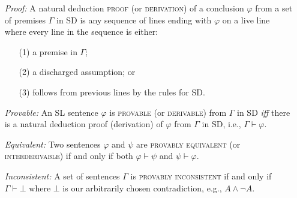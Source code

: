 \documentclass[a4paper, 11pt]{article} %
\begin{document}
\begin{enumerate}
  \item[\it Proof:] A natural deduction \textsc{proof} (or \textsc{derivation}) of a conclusion $\varphi$ from a set of premises $\Gamma$ in SD is any sequence of lines ending with $\varphi$ on a live line where every line in the sequence is either:
      \begin{itemize}
        \item[(1)] a premise in $\Gamma$; 
        \item[(2)] a discharged assumption; or
        \item[(3)] follows from previous lines by the rules for SD.
      \end{itemize}
  \item[\it Provable:] An SL sentence $\varphi$ is \textsc{provable} (or \textsc{derivable}) from $\Gamma$ in SD \textit{iff} there is a natural deduction proof (derivation) of $\varphi$ from $\Gamma$ in SD, i.e., $\Gamma \vdash \varphi$. 
  \item[\it Equivalent:] Two sentences $\varphi$ and $\psi$ are \textsc{provably equivalent} (or \textsc{interderivable}) if and only if both $\varphi\vdash\psi$ and $\psi\vdash\varphi$.
  \item[\it Inconsistent:] A set of sentences $\Gamma$ is \textsc{provably inconsistent} if and only if $\Gamma\vdash\bot$ where $\bot$ is our arbitrarily chosen contradiction, e.g., $A\wedge\neg A$.
\end{enumerate}
\end{document}
